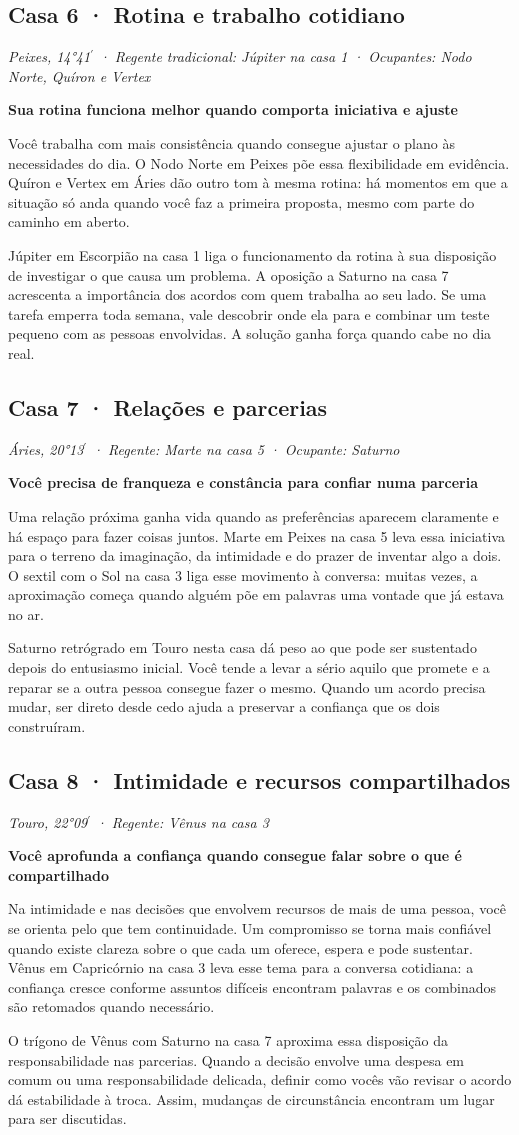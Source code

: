 \documentclass[11pt,a4paper]{article}
\newcommand{\leitura}[3]{\subsection{#1}\textit{#2}\par #3}
\newcommand{\subtituloleitura}[1]{\textbf{#1}\par\nopagebreak[4]}
\begin{document}
\leitura{Casa 6 · Rotina e trabalho cotidiano}{Peixes, 14°41\ensuremath{^{\prime}} · Regente tradicional: Júpiter na casa 1 · Ocupantes: Nodo Norte, Quíron e Vertex}{
\subtituloleitura{Sua rotina funciona melhor quando comporta iniciativa e ajuste}
Você trabalha com mais consistência quando consegue ajustar o plano às necessidades do dia. O Nodo Norte em Peixes põe essa flexibilidade em evidência. Quíron e Vertex em Áries dão outro tom à mesma rotina: há momentos em que a situação só anda quando você faz a primeira proposta, mesmo com parte do caminho em aberto.

Júpiter em Escorpião na casa 1 liga o funcionamento da rotina à sua disposição de investigar o que causa um problema. A oposição a Saturno na casa 7 acrescenta a importância dos acordos com quem trabalha ao seu lado. Se uma tarefa emperra toda semana, vale descobrir onde ela para e combinar um teste pequeno com as pessoas envolvidas. A solução ganha força quando cabe no dia real.
}

\leitura{Casa 7 · Relações e parcerias}{Áries, 20°13\ensuremath{^{\prime}} · Regente: Marte na casa 5 · Ocupante: Saturno}{
\subtituloleitura{Você precisa de franqueza e constância para confiar numa parceria}
Uma relação próxima ganha vida quando as preferências aparecem claramente e há espaço para fazer coisas juntos. Marte em Peixes na casa 5 leva essa iniciativa para o terreno da imaginação, da intimidade e do prazer de inventar algo a dois. O sextil com o Sol na casa 3 liga esse movimento à conversa: muitas vezes, a aproximação começa quando alguém põe em palavras uma vontade que já estava no ar.

Saturno retrógrado em Touro nesta casa dá peso ao que pode ser sustentado depois do entusiasmo inicial. Você tende a levar a sério aquilo que promete e a reparar se a outra pessoa consegue fazer o mesmo. Quando um acordo precisa mudar, ser direto desde cedo ajuda a preservar a confiança que os dois construíram.
}

\leitura{Casa 8 · Intimidade e recursos compartilhados}{Touro, 22°09\ensuremath{^{\prime}} · Regente: Vênus na casa 3}{
\subtituloleitura{Você aprofunda a confiança quando consegue falar sobre o que é compartilhado}
Na intimidade e nas decisões que envolvem recursos de mais de uma pessoa, você se orienta pelo que tem continuidade. Um compromisso se torna mais confiável quando existe clareza sobre o que cada um oferece, espera e pode sustentar. Vênus em Capricórnio na casa 3 leva esse tema para a conversa cotidiana: a confiança cresce conforme assuntos difíceis encontram palavras e os combinados são retomados quando necessário.

O trígono de Vênus com Saturno na casa 7 aproxima essa disposição da responsabilidade nas parcerias. Quando a decisão envolve uma despesa em comum ou uma responsabilidade delicada, definir como vocês vão revisar o acordo dá estabilidade à troca. Assim, mudanças de circunstância encontram um lugar para ser discutidas.
}
\end{document}
